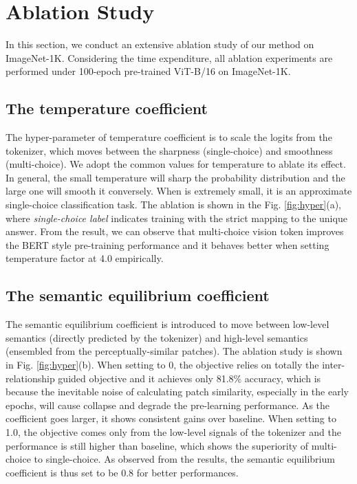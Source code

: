 \documentclass[runningheads]{llncs}
\begin{document}
\section{Ablation Study}
In this section, we conduct an extensive ablation study of our method on ImageNet-1K. Considering the time expenditure, all ablation experiments are performed under 100-epoch pre-trained ViT-B/16 on ImageNet-1K. 


\subsection{The temperature coefficient }
The hyper-parameter of temperature coefficient  is to scale the logits from the tokenizer, which moves between the sharpness (single-choice) and smoothness (multi-choice). We adopt the common values for temperature to ablate its effect. In general, the small temperature will sharp the probability distribution and the large one will smooth it conversely. When  is extremely small, it is an approximate single-choice classification task. The ablation is shown in the Fig. \ref{fig:hyper}(a), where \textit{single-choice label} indicates training with the strict mapping to the unique answer. From the result, we can observe that multi-choice vision token improves the BERT style pre-training performance and it behaves better when setting temperature factor at 4.0 empirically.










\subsection{The semantic equilibrium coefficient }

The semantic equilibrium coefficient  is introduced to move between low-level semantics (directly predicted by the tokenizer) and high-level semantics (ensembled from the perceptually-similar patches).
The ablation study is shown in Fig. \ref{fig:hyper}(b). When setting  to 0, the objective relies on totally the inter-relationship guided objective and it achieves only 81.8\% accuracy, which is because the inevitable noise of calculating patch similarity, especially in the early epochs, will cause collapse and degrade the pre-learning performance. As the coefficient goes larger, it shows consistent gains over baseline. When setting  to 1.0, the objective comes only from the low-level signals of the tokenizer and the performance is still higher than baseline, which shows the superiority of multi-choice to single-choice. As observed from the results, the semantic equilibrium coefficient is thus set to be 0.8 for better performances.
\end{document}
